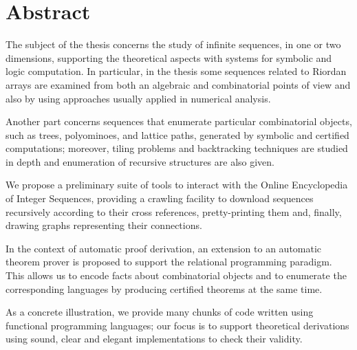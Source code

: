 \documentclass[a4paper,10pt]{tufte-book}
\begin{document}
\fontsize{12pt}{15pt}\selectfont

\blankpage



\blankpage



\cleardoublepage



\cleardoublepage

\chapter*{Abstract}

The subject of the thesis concerns the study of infinite sequences, in one or
two dimensions, supporting the theoretical aspects with systems for symbolic
and logic computation. In particular, in the thesis some sequences related to
Riordan arrays are examined from both an algebraic and combinatorial points of
view and also by using approaches usually applied in numerical analysis.

Another part concerns sequences that enumerate particular combinatorial
objects, such as trees, polyominoes, and lattice paths, generated by symbolic
and certified computations; moreover, tiling problems and backtracking
techniques are studied in depth and enumeration of recursive structures are
also given.

We propose a preliminary suite of tools to interact with the Online
Encyclopedia of Integer Sequences, providing a crawling facility to download
sequences recursively according to their cross references, pretty-printing them
and, finally, drawing graphs representing their connections.

In the context of automatic proof derivation, an extension to an automatic
theorem prover is proposed to support the relational programming paradigm.
This allows us to encode facts about combinatorial objects and to enumerate the
corresponding languages by producing certified theorems at the same time.

As a concrete illustration, we provide many chunks of code written using
functional programming languages; our focus is to support theoretical
derivations using sound, clear and elegant implementations to check their
validity.

\tableofcontents

\listoftables



\cleardoublepage
\end{document}
